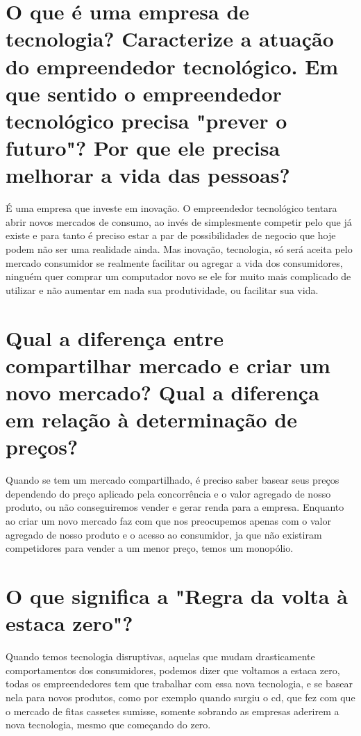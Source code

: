 \documentclass[a4paper,10pt]{article}
\begin{document}
\section{O que é uma empresa de tecnologia? Caracterize a atuação do empreendedor tecnológico. Em que sentido o empreendedor tecnológico precisa "prever o futuro"? Por que ele precisa melhorar a vida das pessoas?}

É uma empresa que investe em inovação. O empreendedor tecnológico tentara abrir novos mercados de consumo, ao invés de simplesmente competir pelo que já existe e para tanto é preciso estar a par de possibilidades de negocio que hoje podem não ser uma realidade ainda. Mas inovação, tecnologia, só será aceita pelo mercado consumidor se realmente facilitar ou agregar a vida dos consumidores, ninguém quer comprar um computador novo se ele for muito mais complicado de utilizar e não aumentar em nada sua produtividade, ou facilitar sua vida.

\section{Qual a diferença entre compartilhar mercado e criar um novo mercado? Qual a diferença em relação à determinação de preços?}

Quando se tem um mercado compartilhado, é preciso saber basear seus preços dependendo do preço aplicado pela concorrência e o valor agregado de nosso produto, ou não conseguiremos vender e gerar renda para a empresa. Enquanto ao criar um novo mercado faz com que nos preocupemos apenas com o valor agregado de nosso produto e o acesso ao consumidor, ja que não existiram competidores para vender a um menor preço, temos um monopólio.


\section{O que significa a "Regra da volta à estaca zero"?}

Quando temos tecnologia disruptivas, aquelas que mudam drasticamente comportamentos dos consumidores, podemos dizer que voltamos a estaca zero, todas os empreendedores tem que trabalhar com essa nova tecnologia, e se basear nela para novos produtos, como por exemplo quando surgiu o cd, que fez com que o mercado de fitas cassetes sumisse, somente sobrando as empresas aderirem a nova tecnologia, mesmo que começando do zero.
\end{document}

